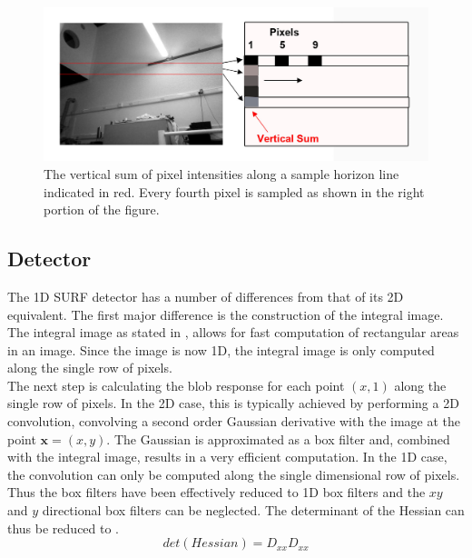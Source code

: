 \documentclass{report}
\begin{document}
\begin{figure}[h!] 
  \centering
    \includegraphics[width=1.0\textwidth]{../Drawings/methods/horizon.jpg}
    \caption{The vertical sum of pixel intensities along a sample horizon line indicated in red. Every fourth pixel is sampled as shown in the right portion of the figure. }
    \label{fig:rows}
\end{figure}

\subsection{Detector}
\label{sec:1dsurfDetect}
The 1D SURF detector has a number of differences from that of its 2D equivalent. The first major difference is the construction of the integral image. The integral image as stated in , allows for fast computation of rectangular areas in an image. Since the image is now 1D, the integral image is only computed along the single row of pixels.\\ 

The next step is calculating the blob response for each point $(x,1)$ along the single row of pixels. In the 2D case, this is typically achieved by performing a 2D convolution, convolving a second order Gaussian derivative with the image at the point $\textbf{x} = (x,y)$. The Gaussian is approximated as a box filter and, combined with the integral image, results in a very efficient computation. In the 1D case, the convolution can only be computed along the single dimensional row of pixels. Thus the box filters have been effectively reduced to 1D box filters and the $xy$ and $y$ directional box filters can be neglected. The determinant of the Hessian can thus be reduced to .\\

\begin{equation}
det(Hessian) = D_{xx}D_{xx}
\label{eqn:reducedHessian}
\end{equation} 
\end{document}
